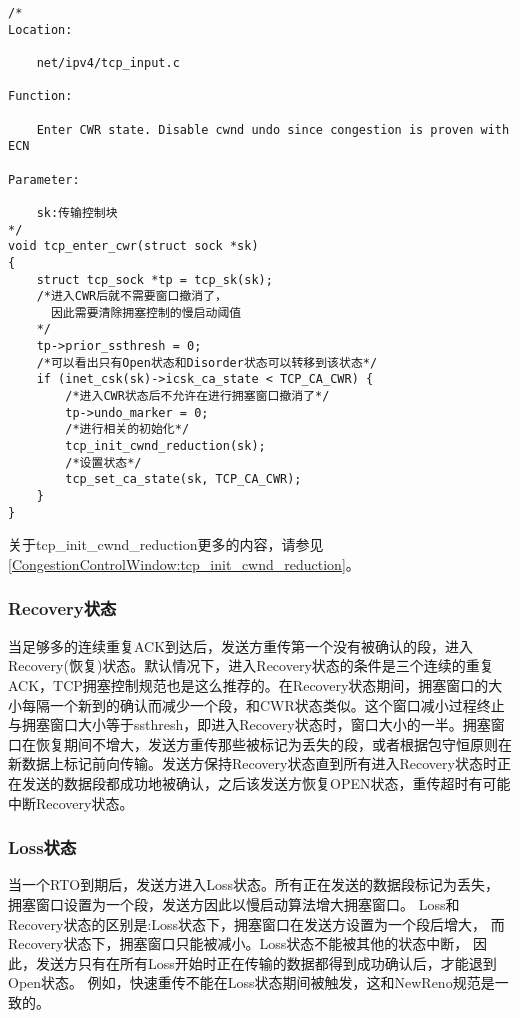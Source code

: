\begin{verbatim}
/* 
Location:

    net/ipv4/tcp_input.c

Function:

    Enter CWR state. Disable cwnd undo since congestion is proven with ECN 

Parameter:

    sk:传输控制块
*/
void tcp_enter_cwr(struct sock *sk)
{
    struct tcp_sock *tp = tcp_sk(sk);
    /*进入CWR后就不需要窗口撤消了，
      因此需要清除拥塞控制的慢启动阈值
    */
    tp->prior_ssthresh = 0;
    /*可以看出只有Open状态和Disorder状态可以转移到该状态*/
    if (inet_csk(sk)->icsk_ca_state < TCP_CA_CWR) {
        /*进入CWR状态后不允许在进行拥塞窗口撤消了*/     
        tp->undo_marker = 0;
        /*进行相关的初始化*/
        tcp_init_cwnd_reduction(sk);
        /*设置状态*/        
        tcp_set_ca_state(sk, TCP_CA_CWR);
    }
}
\end{verbatim}
        关于tcp\_init\_cwnd\_reduction更多的内容，请参见\ref{CongestionControlWindow:tcp_init_cwnd_reduction}。

        \subsubsection{Recovery状态}

            当足够多的连续重复ACK到达后，发送方重传第一个没有被确认的段，进入Recovery(恢复)状态。默认情况下，进入Recovery状态的条件是三个连续的重复ACK，TCP拥塞控制规范也是这么推荐的。在Recovery状态期间，拥塞窗口的大小每隔一个新到的确认而减少一个段，和CWR状态类似。这个窗口减小过程终止与拥塞窗口大小等于ssthresh，即进入Recovery状态时，窗口大小的一半。拥塞窗口在恢复期间不增大，发送方重传那些被标记为丢失的段，或者根据包守恒原则在新数据上标记前向传输。发送方保持Recovery状态直到所有进入Recovery状态时正在发送的数据段都成功地被确认，之后该发送方恢复OPEN状态，重传超时有可能中断Recovery状态。

        \subsubsection{Loss状态}
            \label{CongestionState:Loss}
            当一个RTO到期后，发送方进入Loss状态。所有正在发送的数据段标记为丢失，
            拥塞窗口设置为一个段，发送方因此以慢启动算法增大拥塞窗口。
            Loss和Recovery状态的区别是:Loss状态下，拥塞窗口在发送方设置为一个段后增大，
            而Recovery状态下，拥塞窗口只能被减小。Loss状态不能被其他的状态中断，
            因此，发送方只有在所有Loss开始时正在传输的数据都得到成功确认后，才能退到Open状态。
            例如，快速重传不能在Loss状态期间被触发，这和NewReno规范是一致的。

